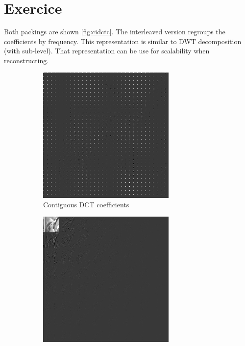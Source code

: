\documentclass[12pt,english]{article}
\renewcommand{\thesection}{Exercice~\arabic{section}}
\begin{document}
\section[]{\thesection}
Both packings are shown \autoref{fig:cidctc}. The interleaved version regroups the coefficients by frequency. This representation is similar to DWT decomposition (with sub-level). That representation can be use for scalability when reconstructing.
 
\begin{figure}
	\centering
	\begin{subfigure}[t]{0.4\textwidth}
		\centering
		\includegraphics[width=.9\textwidth]{img/lenaJPEG8}
		\caption{Contiguous DCT coefficients}
		\label{fig:cdctc}
	\end{subfigure}%
	\qquad%
	\begin{subfigure}[t]{0.4\textwidth}
		\centering
		\includegraphics[width=.9\textwidth]{img/lenaJPEG32}

\end{subfigure}
\end{figure}
\end{document}
